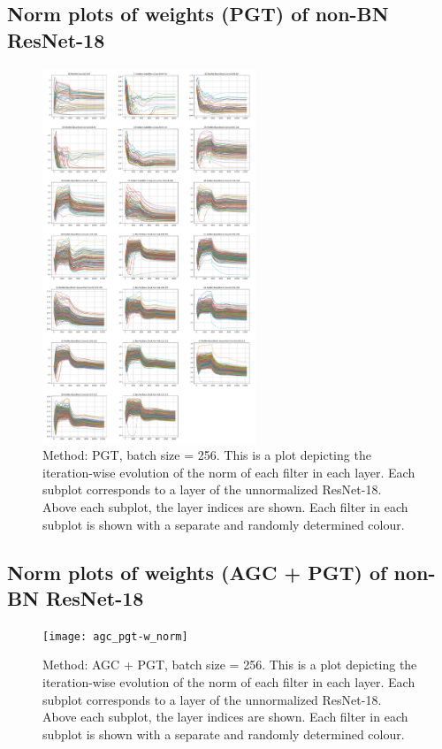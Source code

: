 \documentclass[runningheads]{llncs}
\begin{document}
\subsection{Norm plots of weights (PGT) of non-BN ResNet-18}
\label{sec:plots3}
\begin{figure}[ht] \centering \includegraphics[width=0.57\textwidth]{pgt-w_norm}
\caption{ Method: PGT, batch size = 256. This is a plot depicting the iteration-wise
evolution of the norm of each filter in each layer. Each subplot corresponds to a layer
of the unnormalized ResNet-18. Above each subplot, the layer indices are shown. Each
filter in each subplot is shown with a separate and randomly determined colour. }
\end{figure}

\clearpage

\subsection{Norm plots of weights (AGC + PGT) of non-BN ResNet-18}
\label{sec:plots4}
\begin{figure}[ht] \centering \texttt{[image: agc\_pgt-w\_norm]}
\caption{ Method: AGC + PGT, batch size = 256. This is a plot depicting the
iteration-wise evolution of the norm of each filter in each layer. Each subplot
corresponds to a layer of the unnormalized ResNet-18. Above each subplot, the layer
indices are shown. Each filter in each subplot is shown with a separate and randomly
determined colour. } \end{figure}
\end{document}
